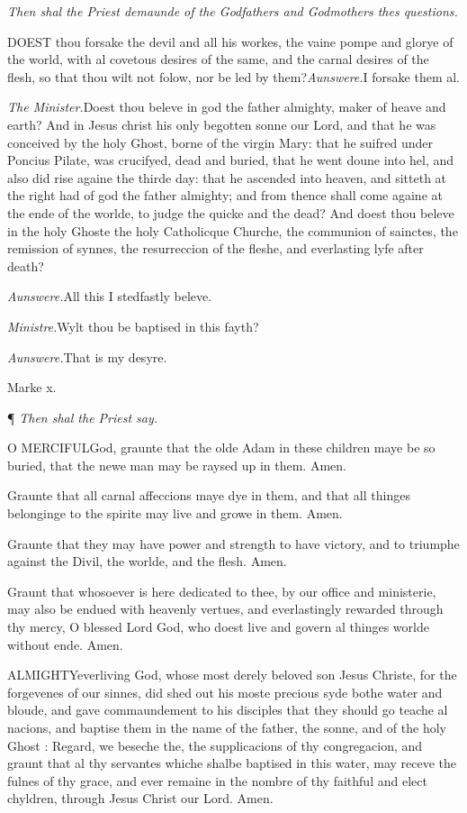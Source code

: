 \emph{Then
shal the Priest demaunde of the Godfathers and Godmothers thes questions.}

DOEST
thou forsake the devil and all his workes, the vaine pompe and glorye
of the world, with al covetous desires of the same, and the carnal desires
of the flesh, so that thou wilt not folow, nor be led by them?\emph{Aunswere.}I forsake them al.

\emph{The Minister.}Doest thou beleve in god the father
almighty, maker of heave and earth? And in Jesus christ his only begotten
sonne our Lord, and that he was conceived by the holy Ghost, borne of
the virgin Mary: that he suifred under Poncius Pilate, was crucifyed,
dead and buried, that he went doune into hel, and also did rise againe
the thirde day: that he ascended into heaven, and sitteth at the right
had of god the father almighty; and from thence shall come againe at the
ende of the worlde, to judge the quicke and the dead? And doest thou beleve
in the holy Ghoste the holy Catholicque Churche, the communion of sainctes,
the remission of synnes, the resurreccion of the fleshe, and everlasting
lyfe after death?

\emph{Aunswere.}All this I stedfastly beleve.

\emph{Ministre.}Wylt thou be baptised in this fayth?

\emph{Aunswere.}That is my desyre.

Marke
x.

¶
\emph{Then shal the Priest say.}

O
MERCIFUL\textbf{}God, graunte that the olde Adam in these children maye
be so buried, that the newe man may be raysed up in them. Amen.

Graunte that all carnal affeccions maye dye in them,
and that all thinges belonginge to the spirite may live and growe in them.
Amen.

Graunte that they may have power and strength to have
victory, and to triumphe against the Divil, the worlde, and the flesh.
Amen.

Graunt that whosoever is here dedicated to thee, by
our office and ministerie, may also be endued with heavenly vertues, and
everlastingly rewarded through thy mercy, O blessed Lord God, who doest
live and govern al thinges worlde without ende. Amen.

ALMIGHTY\textbf{}everliving God, whose most derely beloved son Jesus Christe, for the
forgevenes of our sinnes, did shed out his moste precious syde bothe water
and bloude, and gave commaundement to his disciples that they should go
teache al nacions, and baptise them in the name of the father, the sonne,
and of the holy Ghost : Regard, we beseche the, the supplicacions of thy
congregacion, and graunt that al thy servantes whiche shalbe baptised
in this water, may receve the fulnes of thy grace, and ever remaine in
the nombre of thy faithful and elect chyldren, through Jesus Christ our
Lord. Amen.


